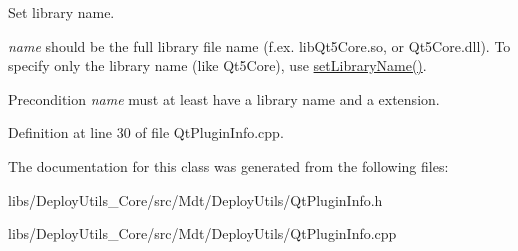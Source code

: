 Set library name. 

{\itshape name} should be the full library file name (f.\+ex. lib\+Qt5\+Core.\+so, or Qt5\+Core.\+dll). To specify only the library name (like Qt5\+Core), use \hyperlink{class_mdt_1_1_deploy_utils_1_1_qt_plugin_info_a957517df8c3a28acc4aea1b941ae00cf}{set\+Library\+Name()}.

\begin{DoxyPrecond}{Precondition}
{\itshape name} must at least have a library name and a extension. 
\end{DoxyPrecond}


Definition at line 30 of file Qt\+Plugin\+Info.\+cpp.



The documentation for this class was generated from the following files\+:\begin{DoxyCompactItemize}
\item 
libs/\+Deploy\+Utils\+\_\+\+Core/src/\+Mdt/\+Deploy\+Utils/Qt\+Plugin\+Info.\+h\item 
libs/\+Deploy\+Utils\+\_\+\+Core/src/\+Mdt/\+Deploy\+Utils/Qt\+Plugin\+Info.\+cpp\end{DoxyCompactItemize}
